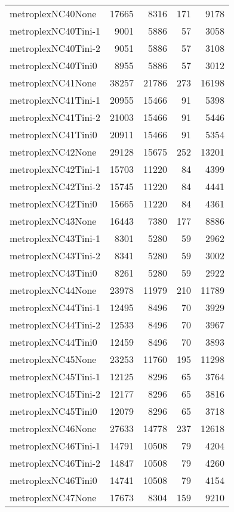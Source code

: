 \begin{longtable}{lrrrr}
metroplexNC40None & 17665 & 8316 & 171 & 9178 \\
metroplexNC40Tini-1 & 9001 & 5886 & 57 & 3058 \\
metroplexNC40Tini-2 & 9051 & 5886 & 57 & 3108 \\
metroplexNC40Tini0 & 8955 & 5886 & 57 & 3012 \\
metroplexNC41None & 38257 & 21786 & 273 & 16198 \\
metroplexNC41Tini-1 & 20955 & 15466 & 91 & 5398 \\
metroplexNC41Tini-2 & 21003 & 15466 & 91 & 5446 \\
metroplexNC41Tini0 & 20911 & 15466 & 91 & 5354 \\
metroplexNC42None & 29128 & 15675 & 252 & 13201 \\
metroplexNC42Tini-1 & 15703 & 11220 & 84 & 4399 \\
metroplexNC42Tini-2 & 15745 & 11220 & 84 & 4441 \\
metroplexNC42Tini0 & 15665 & 11220 & 84 & 4361 \\
metroplexNC43None & 16443 & 7380 & 177 & 8886 \\
metroplexNC43Tini-1 & 8301 & 5280 & 59 & 2962 \\
metroplexNC43Tini-2 & 8341 & 5280 & 59 & 3002 \\
metroplexNC43Tini0 & 8261 & 5280 & 59 & 2922 \\
metroplexNC44None & 23978 & 11979 & 210 & 11789 \\
metroplexNC44Tini-1 & 12495 & 8496 & 70 & 3929 \\
metroplexNC44Tini-2 & 12533 & 8496 & 70 & 3967 \\
metroplexNC44Tini0 & 12459 & 8496 & 70 & 3893 \\
metroplexNC45None & 23253 & 11760 & 195 & 11298 \\
metroplexNC45Tini-1 & 12125 & 8296 & 65 & 3764 \\
metroplexNC45Tini-2 & 12177 & 8296 & 65 & 3816 \\
metroplexNC45Tini0 & 12079 & 8296 & 65 & 3718 \\
metroplexNC46None & 27633 & 14778 & 237 & 12618 \\
metroplexNC46Tini-1 & 14791 & 10508 & 79 & 4204 \\
metroplexNC46Tini-2 & 14847 & 10508 & 79 & 4260 \\
metroplexNC46Tini0 & 14741 & 10508 & 79 & 4154 \\
metroplexNC47None & 17673 & 8304 & 159 & 9210 \\

\end{longtable}
